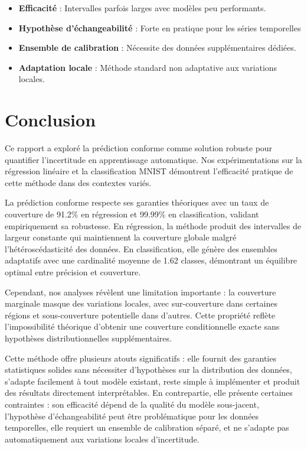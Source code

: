 \documentclass[a4paper,12pt]{article}
\begin{document}
\begin{itemize}
\item \textbf{Efficacité} : Intervalles parfois larges avec modèles peu performants.
\item \textbf{Hypothèse d'échangeabilité} : Forte en pratique pour les séries temporelles
\item \textbf{Ensemble de calibration} : Nécessite des données supplémentaires dédiées.
\item \textbf{Adaptation locale} : Méthode standard non adaptative aux variations locales.
\end{itemize}

\section{Conclusion}

Ce rapport a exploré la prédiction conforme comme solution robuste pour quantifier l'incertitude en apprentissage automatique. Nos expérimentations sur la régression linéaire et la classification MNIST démontrent l'efficacité pratique de cette méthode dans des contextes variés.

La prédiction conforme respecte ses garanties théoriques avec un taux de couverture de 91.2\% en régression et 99.99\% en classification, validant empiriquement sa robustesse. En régression, la méthode produit des intervalles de largeur constante qui maintiennent la couverture globale malgré l'hétéroscédasticité des données. En classification, elle génère des ensembles adaptatifs avec une cardinalité moyenne de 1.62 classes, démontrant un équilibre optimal entre précision et couverture.

Cependant, nos analyses révèlent une limitation importante : la couverture marginale masque des variations locales, avec sur-couverture dans certaines régions et sous-couverture potentielle dans d'autres. Cette propriété reflète l'impossibilité théorique d'obtenir une couverture conditionnelle exacte sans hypothèses distributionnelles supplémentaires.

Cette méthode offre plusieurs atouts significatifs : elle fournit des garanties statistiques solides sans nécessiter d'hypothèses sur la distribution des données, s'adapte facilement à tout modèle existant, reste simple à implémenter et produit des résultats directement interprétables. En contrepartie, elle présente certaines contraintes : son efficacité dépend de la qualité du modèle sous-jacent, l'hypothèse d'échangeabilité peut être problématique pour les données temporelles, elle requiert un ensemble de calibration séparé, et ne s'adapte pas automatiquement aux variations locales d'incertitude.
\end{document}
